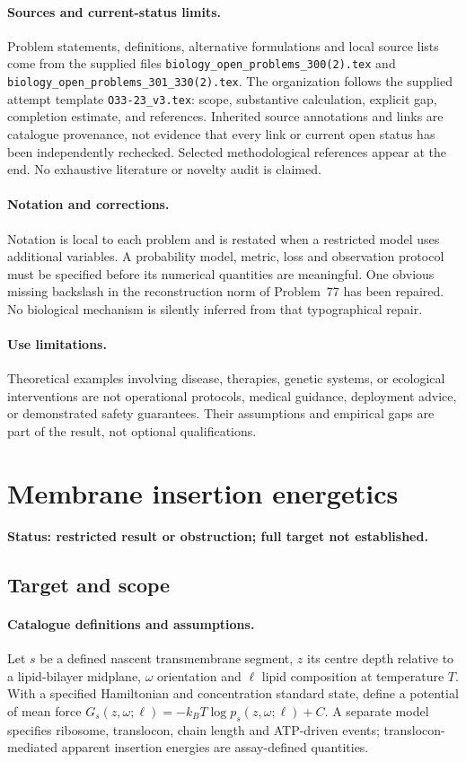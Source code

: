 \documentclass[11pt]{article}
\begin{document}
\paragraph{Sources and current-status limits.}
Problem statements, definitions, alternative formulations and local source lists
come from the supplied files
\texttt{biology\_open\_problems\_300(2).tex} and
\texttt{biology\_open\_problems\_301\_330(2).tex}.
The organization follows the supplied attempt template
\texttt{O33-23\_v3.tex}: scope, substantive calculation, explicit gap,
completion estimate, and references. Inherited source annotations and links are
catalogue provenance, not evidence that every link or current open status has
been independently rechecked. Selected methodological references appear at the
end. No exhaustive literature or novelty audit is claimed.

\paragraph{Notation and corrections.}
Notation is local to each problem and is restated when a restricted model uses
additional variables. A probability model, metric, loss and observation protocol
must be specified before its numerical quantities are meaningful. One obvious
missing backslash in the reconstruction norm of Problem~77 has been repaired.
No biological mechanism is silently inferred from that typographical repair.

\paragraph{Use limitations.}
Theoretical examples involving disease, therapies, genetic systems, or ecological
interventions are not operational protocols, medical guidance, deployment advice,
or demonstrated safety guarantees. Their assumptions and empirical gaps are part
of the result, not optional qualifications.


\section*{Membrane insertion energetics}
\label{prob:084}
\noindent\textbf{Status: restricted result or obstruction; full target not established.}
\subsection{Target and scope}
\paragraph{Catalogue definitions and assumptions.}
Let $s$ be a defined nascent transmembrane segment, $z$ its centre depth relative to a lipid-bilayer midplane, $\omega$ orientation and $\ell$ lipid composition at temperature $T$. With a specified Hamiltonian and concentration standard state, define a potential of mean force $G_s(z,\omega;\ell)=-k_BT\log p_s(z,\omega;\ell)+C$. A separate model specifies ribosome, translocon, chain length and ATP-driven events; translocon-mediated apparent insertion energies are assay-defined quantities.
\end{document}

